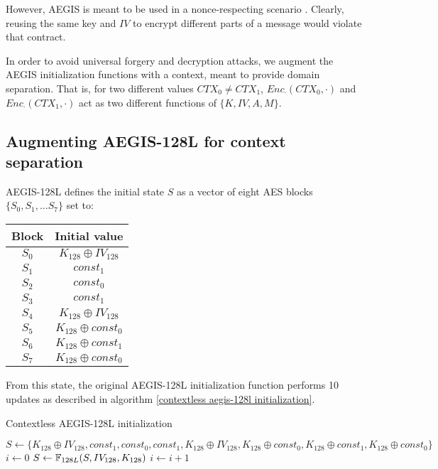\documentclass[envcountsame,runningheads,notitlepage]{llncs}
\begin{document}
However, AEGIS is meant to be used in a nonce-respecting scenario \cite{ACNS:VauViz18}. Clearly, reusing the same key and $IV$ to encrypt different parts of a message would violate that contract.

In order to avoid universal forgery and decryption attacks, we augment the AEGIS initialization functions with a context, meant to provide domain separation. That is, for two different values $CTX_0 \neq CTX_1$, $Enc_{\cdot}(CTX_0, \cdot)$ and $Enc_{\cdot}(CTX_1, \cdot)$ act as two different functions of $\{ K, IV, A, M \}$.

\subsection{Augmenting AEGIS-128L for context separation}
\label{sec:augmenting AEGIS-128L for context separation}

AEGIS-128L defines the initial state $S$ as a vector of eight AES blocks $\{S_0, S_1, \ldots S_7\}$ set to:

\begin{center}
  \begin{tabular}{|c|c|}
    \hline
    Block & Initial value             \\
    \hline
    $S_0$ & $K_{128} \oplus IV_{128}$ \\
    \hline
    $S_1$ & $const_1$                 \\
    \hline
    $S_2$ & $const_0$                 \\
    \hline
    $S_3$ & $const_1$                 \\
    \hline
    $S_4$ & $K_{128} \oplus IV_{128}$ \\
    \hline
    $S_5$ & $K_{128} \oplus const_0$  \\
    \hline
    $S_6$ & $K_{128} \oplus const_1$  \\
    \hline
    $S_7$ & $K_{128} \oplus const_0$  \\
    \hline
  \end{tabular}
\end{center}

From this state, the original AEGIS-128L initialization function performs 10 updates as described in algorithm \ref{contextless aegis-128l initialization}.

\begin{algorithm}
  \caption{Contextless AEGIS-128L initialization}
  \label{contextless aegis-128l initialization}
  \begin{algorithmic}
    \State $S \gets \{ K_{128} \oplus IV_{128}, const_1, const_0, const_1, K_{128} \oplus IV_{128}, K_{128} \oplus const_0, K_{128} \oplus const_1, K_{128} \oplus const_0 \}$
    \State $i \gets 0$
    \State $S \gets \mathbb{F}_{128L}(S, IV_{128}, K_{128})$
    \State $i \gets i+1$
    \EndWhile
    \EndFunction
  \end{algorithmic}
\end{algorithm}
\end{document}
